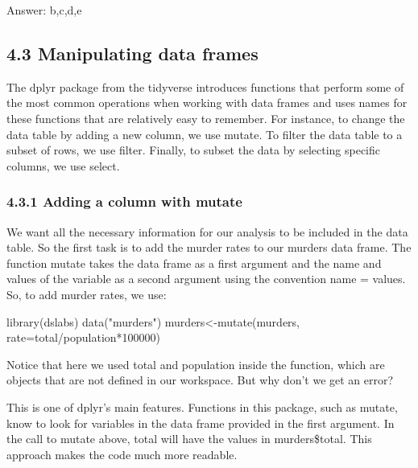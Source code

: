 \documentclass[
]{article}
\newenvironment{Shaded}{\begin{snugshade}}{\end{snugshade}}
\newcommand{\AttributeTok}[1]{\textcolor[rgb]{0.77,0.63,0.00}{#1}}
\newcommand{\DecValTok}[1]{\textcolor[rgb]{0.00,0.00,0.81}{#1}}
\newcommand{\FunctionTok}[1]{\textcolor[rgb]{0.00,0.00,0.00}{#1}}
\newcommand{\NormalTok}[1]{#1}
\newcommand{\OtherTok}[1]{\textcolor[rgb]{0.56,0.35,0.01}{#1}}
\newcommand{\SpecialCharTok}[1]{\textcolor[rgb]{0.00,0.00,0.00}{#1}}
\newcommand{\StringTok}[1]{\textcolor[rgb]{0.31,0.60,0.02}{#1}}
\begin{document}
Answer: b,c,d,e

\hypertarget{manipulating-data-frames}{%
\subsection{4.3 Manipulating data
frames}\label{manipulating-data-frames}}

The dplyr package from the tidyverse introduces functions that perform
some of the most common operations when working with data frames and
uses names for these functions that are relatively easy to remember. For
instance, to change the data table by adding a new column, we use
mutate. To filter the data table to a subset of rows, we use filter.
Finally, to subset the data by selecting specific columns, we use
select.

\hypertarget{adding-a-column-with-mutate}{%
\subsubsection{4.3.1 Adding a column with
mutate}\label{adding-a-column-with-mutate}}

We want all the necessary information for our analysis to be included in
the data table. So the first task is to add the murder rates to our
murders data frame. The function mutate takes the data frame as a first
argument and the name and values of the variable as a second argument
using the convention name = values. So, to add murder rates, we use:

\begin{Shaded}
\begin{Highlighting}[]
\FunctionTok{library}\NormalTok{(dslabs)}
\FunctionTok{data}\NormalTok{(}\StringTok{"murders"}\NormalTok{)}
\NormalTok{murders}\OtherTok{\textless{}{-}}\FunctionTok{mutate}\NormalTok{(murders, }\AttributeTok{rate=}\NormalTok{total}\SpecialCharTok{/}\NormalTok{population}\SpecialCharTok{*}\DecValTok{100000}\NormalTok{)}
\end{Highlighting}
\end{Shaded}

Notice that here we used total and population inside the function, which
are objects that are not defined in our workspace. But why don't we get
an error?

This is one of dplyr's main features. Functions in this package, such as
mutate, know to look for variables in the data frame provided in the
first argument. In the call to mutate above, total will have the values
in murders\$total. This approach makes the code much more readable.
\end{document}

